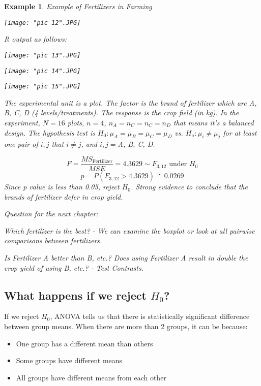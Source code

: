 \documentclass[a4paper,11pt]{article}
\newtheorem{eg}[thm]{Example}
\begin{document}
\begin{eg}
\normalfont

Example of Fertilizers in Farming

\begin{center}
	\texttt{[image: "pic 12".JPG]}
\end{center}
\newpage

R output as follows:

\begin{center}
	\texttt{[image: "pic 13".JPG]}
\end{center}

\begin{center}
	\texttt{[image: "pic 14".JPG]}
\end{center}

\begin{center}
	\texttt{[image: "pic 15".JPG]}
\end{center}

The experimental unit is a plot. The factor is the brand of fertilizer which are A, B, C, D (4 levels/treatments). The response is the crop field (in kg). In the experiment, $N=16$ plots, $n=4$, $n_A=n_C=n_C=n_D$ that means it's a balanced design. The hypothesis test is $H_0: \mu_A=\mu_B=\mu_C=\mu_D$ vs. $H_a: \mu_i\neq \mu_j$ for at least one pair of $i,j$ that $i\neq j$, and $i,j=$A, B, C, D. 

$$F=\frac{MS_{\text{Fertilizer}}}{MSE}=4.3629\sim F_{3,12} \text{ under } H_0$$
$$p=P(F_{3,12}>4.3629)\doteq 0.0269$$
Since p value is less than 0.05, reject $H_0$. Strong evidence to conclude that the brands of fertilizer defer in crop yield. 

Question for the next chapter:

Which fertilizer is the best? - We can examine the boxplot or look at all pairwise comparisons between fertilizers. 

Is Fertilizer A better than B, etc.? Does using Fertilizer A result in double the crop yield of using B, etc.? - Test Contrasts. 

\end{eg}

\subsection{What happens if we reject $H_0$?}
If we reject $H_0$, ANOVA tells us that there is statistically significant difference between group means. When there are more than 2 groups, it can be because: 
\begin{itemize}
\item One group has a different mean than others
\item Some groups have different means
\item All groups have different means from each other
\end{itemize}
\end{document}
